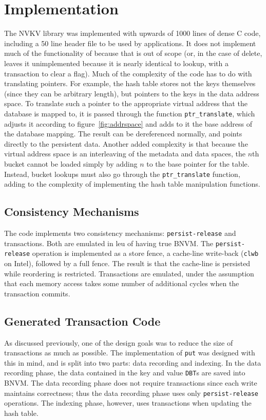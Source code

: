 \section{Implementation}

The NVKV library was implemented with upwards of 1000 lines of dense C code, including
a 50 line header file to be used by applications. It does not implement much of
the functionality of \bdb because that is out of scope (or, in the case of
delete, leaves it unimplemented because it is nearly identical to lookup, with a
transaction to clear a flag). Much of the complexity
of the code has to do with translating pointers. For example, the hash table
stores not the keys themselves (since they can be arbitrary length), but
pointers to the keys in the data address space. To translate such a pointer to
the appropriate virtual address that the database is mapped to, it is passed
through the function \texttt{ptr\_translate}, which adjusts it according to
figure~\ref{fig:addrspace} and adds to it the base address of the database
mapping. The result can be dereferenced normally, and points directly to the
persistent data. Another added complexity is that because the virtual address
space is an interleaving of the metadata and data spaces, the $n$th bucket
cannot be loaded simply by adding $n$ to the base pointer for the table.
Instead, bucket lookups must also go through the \texttt{ptr\_translate}
function, adding to the complexity of implementing the hash table manipulation
functions.

\subsection{Consistency Mechanisms}

The code implements two consistency mechanisms: \texttt{persist-release} and
transactions. Both are emulated in leu of having true BNVM. The
\texttt{persist-release} operation is implemented as a store fence, a cache-line
write-back (\texttt{clwb} on Intel), followed by a full fence. The result is
that the cache-line is persisted while reordering is restricted. Transactions
are emulated, under the assumption that each memory access takes some number of
additional cycles when the transaction commits.


\subsection{Generated Transaction Code}

As discussed previously, one of the design goals was to reduce the size of
transactions as much as possible. The implementation of \texttt{put} was
designed with this in mind, and is split into two parts: data recording and
indexing. In the data recording phase, the data contained in the key and value
\texttt{DBT}s are saved into BNVM.
The data recording
phase does not require transactions since each write maintains correctness; thus
the data recording phase uses only \texttt{persist-release} operations. The
indexing phase, however, uses transactions when updating the hash table.

